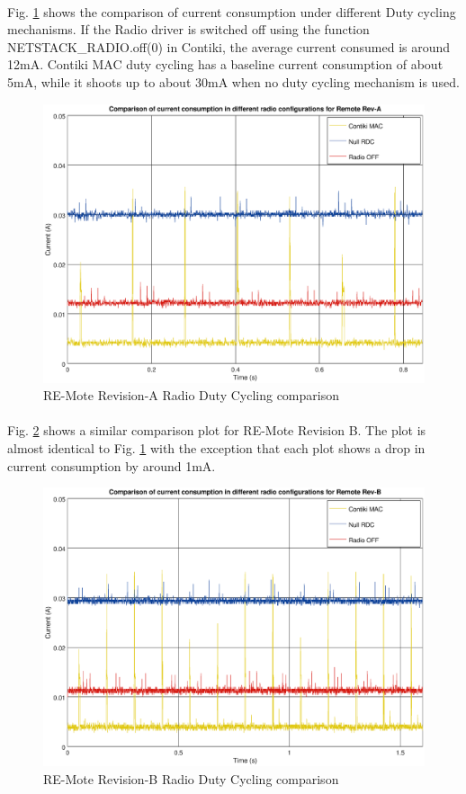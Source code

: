 \documentclass[a4paper]{article}
\begin{document}
\paragraph{}
Fig. \ref{fig:reva-rdcs} shows the comparison of current consumption under different Duty cycling mechanisms. If the Radio driver is switched off using the function NETSTACK\_RADIO.off(0) in Contiki, the average current consumed is around 12mA. Contiki MAC duty cycling has a baseline current consumption of about 5mA, while it shoots up to about 30mA when no duty cycling mechanism is used.
\begin{figure}[H]
  \centering
  \includegraphics[width=1.0\textwidth]{plots/reva-rdc.eps}
  \caption{\label{fig:reva-rdcs}RE-Mote Revision-A Radio Duty Cycling comparison}
\end{figure}

\paragraph{}
Fig. \ref{fig:revb-rdcs} shows a similar comparison plot for RE-Mote Revision B. The plot is almost identical to Fig. \ref{fig:reva-rdcs} with the exception that each plot shows a drop in current consumption by around 1mA.
\begin{figure}[H]
  \centering
  \includegraphics[width=1.0\textwidth]{plots/revb-rdc.eps}
  \caption{\label{fig:revb-rdcs}RE-Mote Revision-B Radio Duty Cycling comparison}
\end{figure}
\end{document}
